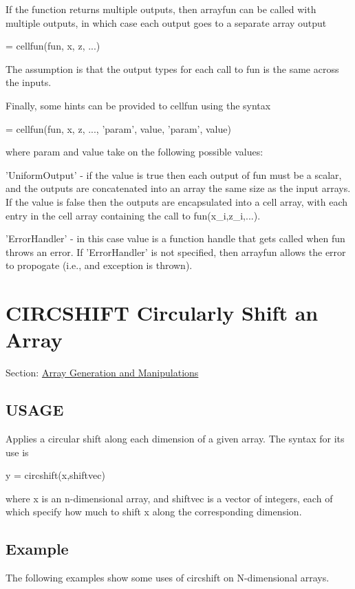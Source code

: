 If the function returns multiple outputs, then {\ttfamily arrayfun} can be called with multiple outputs, in which case each output goes to a separate array output \begin{DoxyVerb}   [y1,y2,...] = cellfun(fun, x, z, ...)
\end{DoxyVerb}
 The assumption is that the output types for each call to {\ttfamily fun} is the same across the inputs.

Finally, some hints can be provided to {\ttfamily cellfun} using the syntax \begin{DoxyVerb}   [y1,y2,...] = cellfun(fun, x, z, ..., 'param', value, 'param', value)
\end{DoxyVerb}
 where {\ttfamily param} and {\ttfamily value} take on the following possible values\-: 
\begin{DoxyItemize}
\item {\ttfamily 'Uniform\-Output'} -\/ if the {\ttfamily value} is {\ttfamily true} then each output of {\ttfamily fun} must be a scalar, and the outputs are concatenated into an array the same size as the input arrays. If the {\ttfamily value} is {\ttfamily false} then the outputs are encapsulated into a cell array, with each entry in the cell array containing the call to {\ttfamily fun(x\-\_\-i,z\-\_\-i,...)}.  
\item {\ttfamily 'Error\-Handler'} -\/ in this case {\ttfamily value} is a function handle that gets called when {\ttfamily fun} throws an error. If {\ttfamily 'Error\-Handler'} is not specified, then {\ttfamily arrayfun} allows the error to propogate (i.\-e., and exception is thrown).  
\end{DoxyItemize}\hypertarget{array_circshift}{}\section{C\-I\-R\-C\-S\-H\-I\-F\-T Circularly Shift an Array}\label{array_circshift}
Section\-: \hyperlink{sec_array}{Array Generation and Manipulations} \hypertarget{typecast_dec2bin_USAGE}{}\subsection{U\-S\-A\-G\-E}\label{typecast_dec2bin_USAGE}
Applies a circular shift along each dimension of a given array. The syntax for its use is \begin{DoxyVerb}   y = circshift(x,shiftvec)
\end{DoxyVerb}
 where {\ttfamily x} is an n-\/dimensional array, and {\ttfamily shiftvec} is a vector of integers, each of which specify how much to shift {\ttfamily x} along the corresponding dimension. \hypertarget{variables_struct_Example}{}\subsection{Example}\label{variables_struct_Example}
The following examples show some uses of {\ttfamily circshift} on N-\/dimensional arrays.


